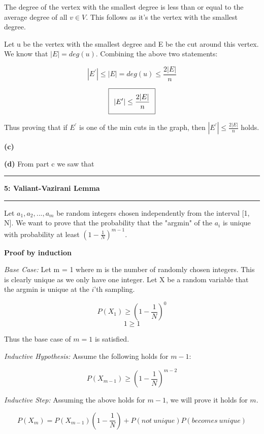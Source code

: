 \documentclass[11pt]{article}
\newcommand\question[2]{\vspace{.25in}\hrule\textbf{#1: #2}\vspace{.5em}\hrule\vspace{.10in}}
\renewcommand\part[1]{\vspace{.10in}\textbf{(#1)}}
\begin{document}
The degree of the vertex with the smallest degree is less than or equal to the average degree of all $v \in V$. This follows as it's the vertex with the smallest degree.

Let u be the vertex with the smallest degree and E be the cut around this vertex. We know that $|E| = deg(u)$. Combining the above two statements:

$$|E^\prime| \leq |E| = deg(u) \leq \frac{2|E|}{n}$$

\begin{equation}
\setlength\fboxsep{0.25cm}
\setlength\fboxrule{0.4pt}
\boxed{|E^\prime| \leq \frac{2|E|}{n}}
\end{equation}

Thus proving that if $E^\prime$ is one of the min cuts in the graph, then $|E^\prime| \leq \frac{2|E|}{n}$ holds.

\part{c}

\part{d} From part c we saw that 

\question{5}{Valiant-Vazirani Lemma} 

Let $a_1, a_2, ... , a_m$ be random integers chosen independently from the interval [1, N]. We want to prove that the probability that the "argmin" of the $a_i$ is unique with probability at least $(1 - \frac{1}{N})^{m-1}$.

\textbf{Proof by induction}

\textit{Base Case:} Let m = 1 where m is the number of randomly chosen integers. This is clearly unique as we only have one integer. Let X be a random variable that the argmin is unique at the $i$'th sampling.

$$P(X_1) \geq (1 - \frac{1}{N})^0 $$
$$1 \geq 1$$

Thus the base case of $m = 1$ is satisfied.

\textit{Inductive Hypothesis:} Assume the following holds for $m - 1$:

$$P(X_{m-1}) \geq (1 - \frac{1}{N})^{m - 2}$$

\textit{Inductive Step:} Assuming the above holds for $m - 1$, we will prove it holds for $m$.

$$P(X_{m}) = P(X_{m-1})(1 - \frac{1}{N}) + P(not \ unique)P(becomes \ unique)$$
\end{document}

